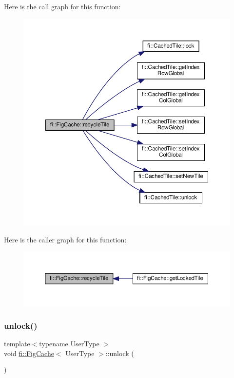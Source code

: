 Here is the call graph for this function\+:
\nopagebreak
\begin{figure}[H]
\begin{center}
\leavevmode
\includegraphics[width=350pt]{d7/d31/classfi_1_1FigCache_a611074d024b48d548a84dbb08c97eb3d_cgraph}
\end{center}
\end{figure}
Here is the caller graph for this function\+:
\nopagebreak
\begin{figure}[H]
\begin{center}
\leavevmode
\includegraphics[width=350pt]{d7/d31/classfi_1_1FigCache_a611074d024b48d548a84dbb08c97eb3d_icgraph}
\end{center}
\end{figure}
\mbox{\label{classfi_1_1FigCache_af463d23f5dbf6f418e14da2e26774e10}} 
\subsubsection{\texorpdfstring{unlock()}{unlock()}}
{\footnotesize\ttfamily template$<$typename User\+Type $>$ \\
void \hyperlink{classfi_1_1FigCache}{fi\+::\+Fig\+Cache}$<$ User\+Type $>$\+::unlock (\begin{DoxyParamCaption}{ }\end{DoxyParamCaption})\hspace{0.3cm}{\ttfamily [inline]}}



